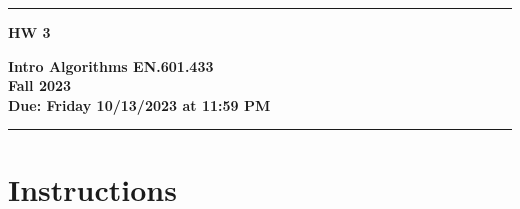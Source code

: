 \documentclass[letter,11pt]{article}
\begin{document}
\noindent\rule[2mm]{\textwidth}{1.5mm}
\noindent
\begin{minipage}{.3\textwidth}
  \vspace{-3mm}
  {\Huge\bf HW 3}
\end{minipage}\hfill\begin{minipage}{.5\textwidth}
\begin{flushright}
  {\bf Intro Algorithms EN.601.433 \\
  Fall 2023 \\
  Due: Friday 10/13/2023 at 11:59 PM}%
\vspace{3mm}
\end{flushright}
\end{minipage}
\noindent\rule{\textwidth}{1.5mm}

\section*{Instructions}
\end{document}
